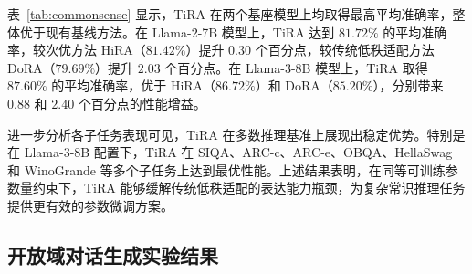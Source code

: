 \documentclass[UTF8,a4paper,11pt]{ctexart}
\begin{document}
表~\ref{tab:commonsense} 显示，TiRA 在两个基座模型上均取得最高平均准确率，整体优于现有基线方法。在 Llama-2-7B 模型上，TiRA 达到 $81.72\%$ 的平均准确率，较次优方法 HiRA（$81.42\%$）提升 $0.30$ 个百分点，较传统低秩适配方法 DoRA（$79.69\%$）提升 $2.03$ 个百分点。在 Llama-3-8B 模型上，TiRA 取得 $87.60\%$ 的平均准确率，优于 HiRA（$86.72\%$）和 DoRA（$85.20\%$），分别带来 $0.88$ 和 $2.40$ 个百分点的性能增益。

进一步分析各子任务表现可见，TiRA 在多数推理基准上展现出稳定优势。特别是在 Llama-3-8B 配置下，TiRA 在 SIQA、ARC-c、ARC-e、OBQA、HellaSwag 和 WinoGrande 等多个子任务上达到最优性能。上述结果表明，在同等可训练参数量约束下，TiRA 能够缓解传统低秩适配的表达能力瓶颈，为复杂常识推理任务提供更有效的参数微调方案。

\subsection{开放域对话生成实验结果}

\begin{table}[H]
\centering
\small
\caption{各参数高效微调方法在 ConvAI2 开放域对话生成数据集上的性能对比。除 TiRA 外，其余基线结果引自 HiRA。最优结果以粗体标示。}
\label{tab:dialogue}
\end{table}
\end{document}
